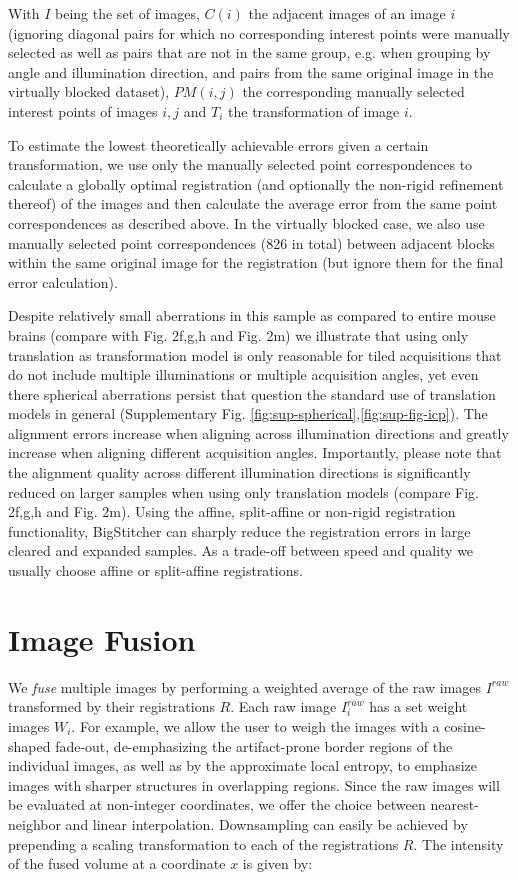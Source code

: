 With $I$ being the set of images, $C(i)$ the adjacent images of an image $i$ (ignoring diagonal pairs for which no corresponding interest points were manually selected as well as pairs that are not in the same group, e.g. when grouping by angle and illumination direction, and pairs from the same original image in the virtually blocked dataset), $PM(i,j)$ the corresponding manually selected interest points of images $i,j$ and $T_i$ the transformation of image $i$.

To estimate the lowest theoretically achievable errors given a certain transformation, we use only the manually selected point correspondences to calculate a globally optimal registration (and optionally the non-rigid refinement thereof) of the images and then calculate the average error from the same point correspondences as described above. In the virtually blocked case, we also use manually selected point correspondences (826 in total) between adjacent blocks within the same original image for the registration (but ignore them for the final error calculation). 

Despite relatively small aberrations in this sample as compared to entire mouse brains (compare with Fig. 2f,g,h and Fig. 2m) we illustrate that using only translation as transformation model is only reasonable for tiled acquisitions that do not include multiple illuminations or multiple acquisition angles, yet even there spherical aberrations persist that question the standard use of translation models in general (Supplementary Fig. \ref{fig:sup-spherical},\ref{fig:sup-fig-icp}). The alignment errors increase when aligning across illumination directions and greatly increase when aligning different acquisition angles. Importantly, please note that the alignment quality across different illumination directions is significantly reduced on larger samples when using only translation models (compare Fig. 2f,g,h and Fig. 2m). Using the affine, split-affine or non-rigid registration functionality, BigStitcher can sharply reduce the registration errors in large cleared and expanded samples. As a trade-off between speed and quality we usually choose affine or split-affine registrations.

\section{Image Fusion}
\label{sec:fusion}

We \emph{fuse} multiple images by performing a weighted average of the raw images $I^{raw}$ transformed by their registrations $R$. Each raw image $I^{raw}_i$ has a set weight images $W_i$. For example, we allow the user to weigh the images with a cosine-shaped fade-out, de-emphasizing the artifact-prone border regions of the individual images, as well as by the approximate local entropy, to emphasize images with sharper structures in overlapping regions. Since the raw images will be evaluated at non-integer coordinates, we offer the choice between nearest-neighbor and linear interpolation. Downsampling can easily be achieved by prepending a scaling transformation to each of the registrations $R$. The intensity of the fused volume at a coordinate $x$ is given by:

